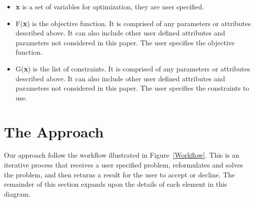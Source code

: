 \documentclass[10pt]{article}
\begin{document}
\begin{itemize}
	\item \textbf{x} is a set of variables for optimization, they are user specified.
	
	\item F(\textbf{x}) is the objective function. It is comprised of any parameters or attributes described above. It can also include other user defined attributes and parameters not considered in this paper. The user specifies the objective function.  
	
	\item G(\textbf{x}) is the list of constraints. It is comprised of any parameters or attributes described above. It can also include other user defined attributes and parameters not considered in this paper. The user specifies the constraints to use.
\end{itemize}


\section{The Approach}
\label{sec:The_Approach}



Our approach follow the workflow illustrated in Figure~\ref{Workflow}. This is an iterative process that receives a user specified problem, reformulates and solves the problem, and then returns a result for the user to accept or decline. The remainder of this section expands upon the details of each element in this diagram.
\end{document}

